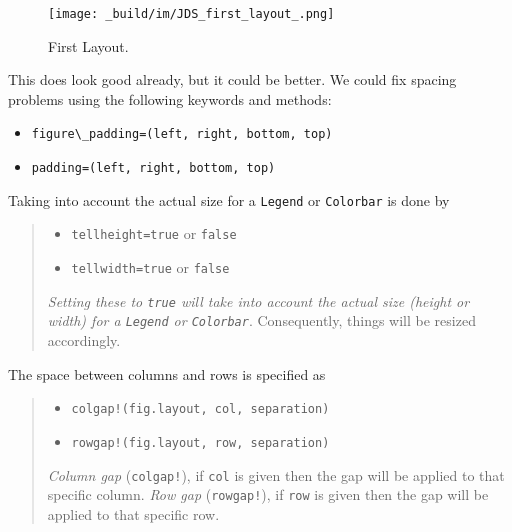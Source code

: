 \documentclass[
  notoc %
]{tufte-book}
\providecommand{\tightlist}{%
  \setlength{\itemsep}{0pt}\setlength{\parskip}{0pt}
}
\newcommand{\passthrough}[1]{#1}
\begin{document}
\begin{figure}
\hypertarget{fig:first_layout}{%
\centering
\texttt{[image: \_build/im/JDS\_first\_layout\_.png]}
\caption{First Layout.}\label{fig:first_layout}
}
\end{figure}

This does look good already, but it could be better. We could fix
spacing problems using the following keywords and methods:

\begin{itemize}
\tightlist
\item
  \passthrough{\lstinline!figure\_padding=(left, right, bottom, top)!}
\item
  \passthrough{\lstinline!padding=(left, right, bottom, top)!}
\end{itemize}

Taking into account the actual size for a
\passthrough{\lstinline!Legend!} or \passthrough{\lstinline!Colorbar!}
is done by

\begin{quote}
\begin{itemize}
\tightlist
\item
  \passthrough{\lstinline!tellheight=true!} or
  \passthrough{\lstinline!false!}
\item
  \passthrough{\lstinline!tellwidth=true!} or
  \passthrough{\lstinline!false!}
\end{itemize}

\emph{Setting these to \passthrough{\lstinline!true!} will take into
account the actual size (height or width) for a
\passthrough{\lstinline!Legend!} or \passthrough{\lstinline!Colorbar!}}.
Consequently, things will be resized accordingly.
\end{quote}

The space between columns and rows is specified as

\begin{quote}
\begin{itemize}
\tightlist
\item
  \passthrough{\lstinline"colgap!(fig.layout, col, separation)"}
\item
  \passthrough{\lstinline"rowgap!(fig.layout, row, separation)"}
\end{itemize}

\emph{Column gap} (\passthrough{\lstinline"colgap!"}), if
\passthrough{\lstinline!col!} is given then the gap will be applied to
that specific column. \emph{Row gap}
(\passthrough{\lstinline"rowgap!"}), if \passthrough{\lstinline!row!} is
given then the gap will be applied to that specific row.
\end{quote}
\end{document}
